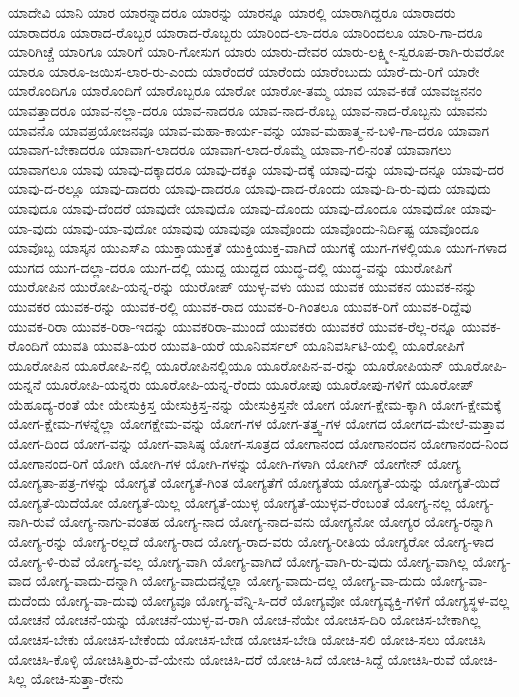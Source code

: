 {ಯಾದೇವಿ
ಯಾನಿ
ಯಾರ
ಯಾರನ್ನಾದರೂ
ಯಾರನ್ನು
ಯಾರನ್ನೂ
ಯಾರಲ್ಲಿ
ಯಾರಾಗಿದ್ದರೂ
ಯಾರಾದರು
ಯಾರಾದರೂ
ಯಾರಾದ-ರೊಬ್ಬರ
ಯಾರಾದ-ರೊಬ್ಬರು
ಯಾರಿಂದ-ಲಾ-ದರೂ
ಯಾರಿಂದಲೂ
ಯಾರಿ-ಗಾ-ದರೂ
ಯಾರಿಗಿಚ್ಚೆ
ಯಾರಿಗೂ
ಯಾರಿಗೆ
ಯಾರಿ-ಗೋಸುಗ
ಯಾರು
ಯಾರು-ದೇವರ
ಯಾರು-ಲಕ್ಷ್ಮೀ-ಸ್ವರೂಪ-ರಾಗಿ-ರುವರೋ
ಯಾರೂ
ಯಾರೂ-ಜಯಿಸ-ಲಾರ-ರು-ಎಂದು
ಯಾರೆಂದರೆ
ಯಾರೆಂದು
ಯಾರೆಂಬುದು
ಯಾರೆ-ದು-ರಿಗೆ
ಯಾರೇ
ಯಾರೊಂದಿಗೂ
ಯಾರೊಂದಿಗೆ
ಯಾರೊಬ್ಬರೂ
ಯಾರೋ
ಯಾರೋ-ತಮ್ಮ
ಯಾವ
ಯಾವ-ಕಡೆ
ಯಾವಜ್ಜನನಂ
ಯಾವತ್ತಾದರೂ
ಯಾವ-ನಲ್ಲಾ-ದರೂ
ಯಾವ-ನಾದರೂ
ಯಾವ-ನಾದ-ರೊಬ್ಬ
ಯಾವ-ನಾದ-ರೊಬ್ಬನು
ಯಾವನು
ಯಾವನೊ
ಯಾವಪ್ರಯೋಜನವೂ
ಯಾವ-ಮಹಾ-ಕಾರ್ಯ-ವನ್ನು
ಯಾವ-ಮಹಾತ್ಮ-ನ-ಬಳಿ-ಗಾ-ದರೂ
ಯಾವಾಗ
ಯಾವಾಗ-ಬೇಕಾದರೂ
ಯಾವಾಗ-ಲಾದರೂ
ಯಾವಾಗ-ಲಾದ-ರೊಮ್ಮೆ
ಯಾವಾ-ಗಲಿ-ನಂತೆ
ಯಾವಾಗಲು
ಯಾವಾಗಲೂ
ಯಾವು
ಯಾವು-ದಕ್ಕಾದರೂ
ಯಾವು-ದಕ್ಕೂ
ಯಾವು-ದಕ್ಕೆ
ಯಾವು-ದನ್ನು
ಯಾವು-ದನ್ನೂ
ಯಾವು-ದರ
ಯಾವು-ದ-ರಲ್ಲೂ
ಯಾವು-ದಾದರು
ಯಾವು-ದಾದರೂ
ಯಾವು-ದಾದ-ರೊಂದು
ಯಾವು-ದಿ-ರು-ವುದು
ಯಾವುದು
ಯಾವುದೂ
ಯಾವು-ದೆಂದರೆ
ಯಾವುದೇ
ಯಾವುದೊ
ಯಾವು-ದೊಂದು
ಯಾವು-ದೊಂದೂ
ಯಾವುದೋ
ಯಾವು-ಯಾ-ವುದು
ಯಾವು-ಯಾ-ವುದೋ
ಯಾವುವು
ಯಾವುವೂ
ಯಾವೊಂದು
ಯಾವೊಂದು-ನಿರ್ದಿಷ್ಟ
ಯಾವೊಂದೂ
ಯಾವೊಬ್ಬ
ಯಾಸ್ಕನ
ಯುಎಸ್ಎ
ಯುಕ್ತಾಯುಕ್ತತೆ
ಯುಕ್ತಿಯುಕ್ತ-ವಾಗಿದೆ
ಯುಗಕ್ಕೆ
ಯುಗ-ಗಳಲ್ಲಿಯೂ
ಯುಗ-ಗಳಾದ
ಯುಗದ
ಯುಗ-ದಲ್ಲಾ-ದರೂ
ಯುಗ-ದಲ್ಲಿ
ಯುದ್ದ
ಯುದ್ದದ
ಯುದ್ಧ-ದಲ್ಲಿ
ಯುದ್ಧ-ವನ್ನು
ಯುರೋಪಿಗೆ
ಯುರೋಪಿನ
ಯುರೋಪಿ-ಯನ್ನ-ರನ್ನು
ಯುರೋಪ್
ಯುಳ್ಳ-ವಳು
ಯುವ
ಯುವಕ
ಯುವಕನ
ಯುವಕ-ನನ್ನು
ಯುವಕರ
ಯುವಕ-ರನ್ನು
ಯುವಕ-ರಲ್ಲಿ
ಯುವಕ-ರಾದ
ಯುವಕ-ರಿ-ಗಿಂತಲೂ
ಯುವಕ-ರಿಗೆ
ಯುವಕ-ರಿದ್ದೆವು
ಯುವಕ-ರಿರಾ
ಯುವಕ-ರಿರಾ-ಇದನ್ನು
ಯುವಕರಿರಾ-ಮುಂದೆ
ಯುವಕರು
ಯುವಕರೆ
ಯುವಕ-ರೆಲ್ಲ-ರನ್ನೂ
ಯುವಕ-ರೊಂದಿಗೆ
ಯುವತಿ
ಯುವತಿ-ಯರ
ಯುವತಿ-ಯರೆ
ಯೂನಿವರ್ಸಲ್
ಯೂನಿವರ್ಸಿಟಿ-ಯಲ್ಲಿ
ಯೂರೋಪಿಗೆ
ಯೂರೋಪಿನ
ಯೂರೋಪಿ-ನಲ್ಲಿ
ಯೂರೋಪಿನಲ್ಲಿಯೂ
ಯೂರೋಪಿನ-ವ-ರನ್ನು
ಯೂರೋಪಿಯನ್
ಯೂರೋಪಿ-ಯನ್ನನೆ
ಯೂರೋಪಿ-ಯನ್ನರು
ಯೂರೋಪಿ-ಯನ್ನ-ರೆಂದು
ಯೂರೋಪು
ಯೂರೋಪು-ಗಳಿಗೆ
ಯೂರೋಪ್
ಯೆಹೂದ್ಯ-ರಂತೆ
ಯೇ
ಯೇಸುಕ್ರಿಸ್ತ
ಯೇಸುಕ್ರಿಸ್ತ-ನನ್ನು
ಯೇಸುಕ್ರಿಸ್ತನೇ
ಯೋಗ
ಯೋಗ-ಕ್ಷೇಮ-ಕ್ಕಾಗಿ
ಯೋಗ-ಕ್ಷೇಮಕ್ಕೆ
ಯೋಗ-ಕ್ಷೇಮ-ಗಳನ್ನೆಲ್ಲಾ
ಯೋಗಕ್ಷೇಮ-ವನ್ನು
ಯೋಗ-ಗಳ
ಯೋಗ-ತತ್ತ್ವ-ಗಳ
ಯೋಗದ
ಯೋಗದ-ಮೇಲೆ-ಮತ್ತಾವ
ಯೋಗ-ದಿಂದ
ಯೋಗ-ವನ್ನು
ಯೋಗ-ವಾಸಿಷ್ಠ
ಯೋಗ-ಸೂತ್ರದ
ಯೋಗಾನಂದ
ಯೋಗಾನಂದನ
ಯೋಗಾನಂದ-ನಿಂದ
ಯೋಗಾನಂದ-ರಿಗೆ
ಯೋಗಿ
ಯೋಗಿ-ಗಳ
ಯೋಗಿ-ಗಳನ್ನು
ಯೋಗಿ-ಗಳಾಗಿ
ಯೋಗಿನ್
ಯೋಗೇನ್
ಯೋಗ್ಯ
ಯೋಗ್ಯತಾ-ಪತ್ರ-ಗಳನ್ನು
ಯೋಗ್ಯತೆ
ಯೋಗ್ಯತೆ-ಗಿಂತ
ಯೋಗ್ಯತೆಗೆ
ಯೋಗ್ಯತೆಯ
ಯೋಗ್ಯತೆ-ಯನ್ನು
ಯೋಗ್ಯತೆ-ಯಿದೆ
ಯೋಗ್ಯತೆ-ಯಿದೆಯೋ
ಯೋಗ್ಯತೆ-ಯಿಲ್ಲ
ಯೋಗ್ಯತೆ-ಯುಳ್ಳ
ಯೋಗ್ಯತೆ-ಯುಳ್ಳವ-ರೆಂಬಂತೆ
ಯೋಗ್ಯ-ನಲ್ಲ
ಯೋಗ್ಯ-ನಾಗಿ-ರುವೆ
ಯೋಗ್ಯ-ನಾಗು-ವಂತಹ
ಯೋಗ್ಯ-ನಾದ
ಯೋಗ್ಯ-ನಾದ-ವನು
ಯೋಗ್ಯನೋ
ಯೋಗ್ಯರ
ಯೋಗ್ಯ-ರನ್ನಾಗಿ
ಯೋಗ್ಯ-ರನ್ನು
ಯೋಗ್ಯ-ರಲ್ಲದೆ
ಯೋಗ್ಯ-ರಾದ
ಯೋಗ್ಯ-ರಾದ-ವರು
ಯೋಗ್ಯ-ರೀತಿಯ
ಯೋಗ್ಯರೋ
ಯೋಗ್ಯ-ಳಾದ
ಯೋಗ್ಯ-ಳಿ-ರುವೆ
ಯೋಗ್ಯ-ವಲ್ಲ
ಯೋಗ್ಯ-ವಾಗಿ
ಯೋಗ್ಯ-ವಾಗಿದೆ
ಯೋಗ್ಯ-ವಾಗಿ-ರು-ವುದು
ಯೋಗ್ಯ-ವಾಗಿಲ್ಲ
ಯೋಗ್ಯ-ವಾದ
ಯೋಗ್ಯ-ವಾದು-ದನ್ನಾಗಿ
ಯೋಗ್ಯ-ವಾದುದನ್ನೆಲ್ಲಾ
ಯೋಗ್ಯ-ವಾದು-ದಲ್ಲ
ಯೋಗ್ಯ-ವಾ-ದುದು
ಯೋಗ್ಯ-ವಾ-ದುದೆಂದು
ಯೋಗ್ಯ-ವಾ-ದುವು
ಯೋಗ್ಯವೂ
ಯೋಗ್ಯ-ವೆನ್ನಿ-ಸಿ-ದರೆ
ಯೋಗ್ಯವೋ
ಯೋಗ್ಯವ್ಯಕ್ತಿ-ಗಳಿಗೆ
ಯೋಗ್ಯಸ್ಥಳ-ವಲ್ಲ
ಯೋಚನೆ
ಯೋಚನೆ-ಯನ್ನು
ಯೋಚನೆ-ಯುಳ್ಳ-ವ-ರಾಗಿ
ಯೋಚ-ನೆಯೇ
ಯೋಚಿಸ-ದಿರಿ
ಯೋಚಿಸ-ಬೇಕಾಗಿಲ್ಲ
ಯೋಚಿಸ-ಬೇಕು
ಯೋಚಿಸ-ಬೇಕೆಂದು
ಯೋಚಿಸ-ಬೇಡ
ಯೋಚಿಸ-ಬೇಡಿ
ಯೋಚಿ-ಸಲಿ
ಯೋಚಿ-ಸಲು
ಯೋಚಿಸಿ
ಯೋಚಿಸಿ-ಕೊಳ್ಳಿ
ಯೋಚಿಸಿತ್ತಿರು-ವೆ-ಯೇನು
ಯೋಚಿಸಿ-ದರೆ
ಯೋಚಿ-ಸಿದೆ
ಯೋಚಿ-ಸಿದ್ದೆ
ಯೋಚಿಸಿ-ರುವೆ
ಯೋಚಿ-ಸಿಲ್ಲ
ಯೋಚಿ-ಸುತ್ತಾ-ರೇನು
}

